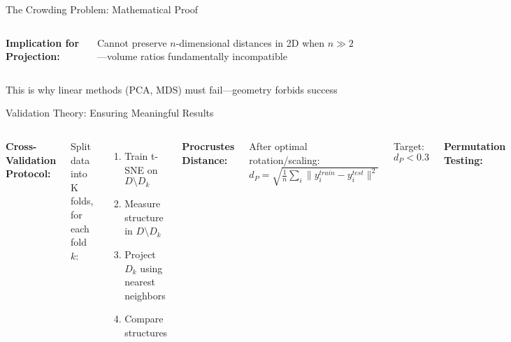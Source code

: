 \documentclass[aspectratio=169]{beamer}
\begin{document}
\begin{frame}{The Crowding Problem: Mathematical Proof}
\begin{columns}

\vspace{0.2cm}
\textbf{Implication for Projection:}

Cannot preserve $n$-dimensional distances in 2D when $n \gg 2$—volume ratios fundamentally incompatible
\end{columns}

\vspace{0.3cm}
\colorbox{red!20}{\parbox{0.95\textwidth}{\centering This is why linear methods (PCA, MDS) must fail—geometry forbids success}}
\end{frame}

\begin{frame}{Validation Theory: Ensuring Meaningful Results}
\begin{columns}
\textbf{Cross-Validation Protocol:}

Split data into K folds, for each fold $k$:
\begin{enumerate}
\item Train t-SNE on $D \setminus D_k$
\item Measure structure in $D \setminus D_k$
\item Project $D_k$ using nearest neighbors
\item Compare structures
\end{enumerate}

\textbf{Procrustes Distance:}

After optimal rotation/scaling:
$d_P = \sqrt{\frac{1}{n}\sum_i \|y_i^{train} - y_i^{test}\|^2}$

Target: $d_P < 0.3$

\textbf{Permutation Testing:}

Null hypothesis: structure is noise

\begin{enumerate}
\item Compute metric on real data: $M_{real}$
\item Permute labels 1000 times
\item Compute metric on each: $M_{perm}$
\item p-value = $\frac{\#(M_{perm} \geq M_{real})}{1000}$
\end{enumerate}

\end{columns}
\end{frame}
\end{document}
